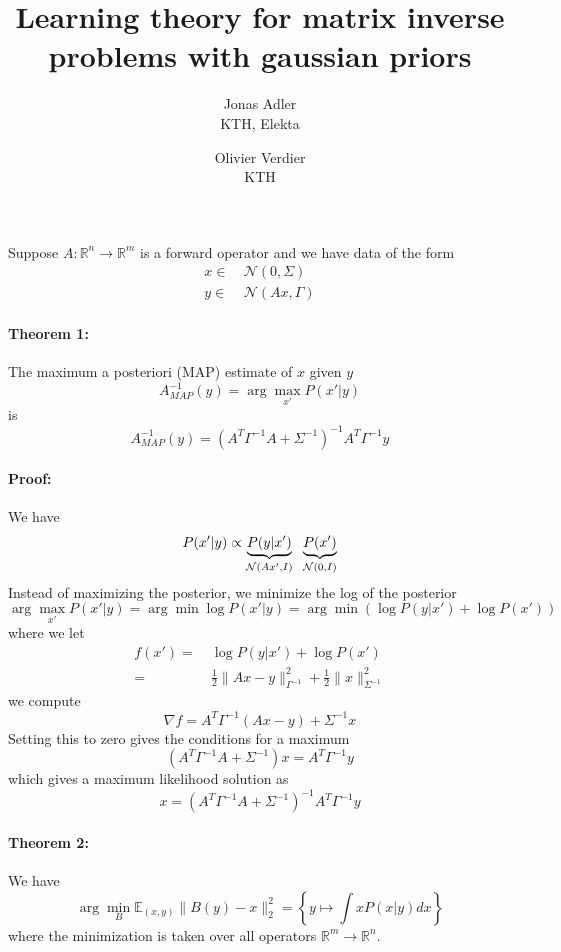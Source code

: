 \documentclass[a4paper,10pt]{article}
\title{Learning theory for matrix inverse problems with gaussian priors}
\author{Jonas Adler  \\ {\small KTH, Elekta} \and Olivier Verdier \\ {\small KTH}}
\date{}
\begin{document}
	\maketitle
	
	Suppose $A : \mathbb{R}^n \to \mathbb{R}^m$ is a forward operator and we have data of the form
	\begin{align*}
		x \in&\ \mathcal{N}(0, \Sigma) \\
		y \in&\ \mathcal{N}(Ax, \Gamma)
	\end{align*}
	
	\paragraph{Theorem 1:}
	The maximum a posteriori (MAP) estimate of $x$ given $y$
	\[
	    A^{-1}_{MAP}(y) = \arg\max_{x'} P(x' | y)
	\]
	is
	\[
		A^{-1}_{MAP}(y) = (A^T \Gamma^{-1} A + \Sigma^{-1})^{-1} A^T \Gamma^{-1} y
	\]
	
	\paragraph{Proof:} We have
	\[
		P(x' | y) \propto \underbrace{P(y | x')}_{\mathcal{N}(Ax', I)} \hspace{2mm} \underbrace{P(x')}_{\mathcal{N}(0, I)} 
	\]
	Instead of maximizing the posterior, we minimize the log of the posterior
	\[
		\arg\max_{x'} P(x' | y) = \arg\min \log P(x' | y) = \arg\min \left( \log P(y | x') + \log P(x') \right)
	\]
	where we let
	\begin{align*}
		f(x') =&\ \log P(y | x') + \log P(x') \\
		=&\ \frac{1}{2} \| Ax - y \|_{\Gamma^{-1}}^2 + \frac{1}{2} \| x \|_{\Sigma^{-1}}^2
	\end{align*}
	we compute
	\[
		\nabla f = A^T \Gamma^{-1} (Ax - y) + \Sigma^{-1} x
	\]
	Setting this to zero gives the conditions for a maximum
	\[
		(A^T \Gamma^{-1} A + \Sigma^{-1}) x = A^T \Gamma^{-1} y
	\]
	which gives a maximum likelihood solution as
	\[
		x = (A^T \Gamma^{-1} A + \Sigma^{-1})^{-1} A^T \Gamma^{-1} y
	\]
	
	\paragraph{Theorem 2:} We have
	\[
		\arg \min_{B} \mathbb{E}_{(x, y)} \|B(y) - x\|_2^2 = \left\{ y \mapsto \int x P(x | y) dx \right\}
	\]
	where the minimization is taken over all operators $\mathbb{R}^m \to \mathbb{R}^n$.
	
\end{document}
